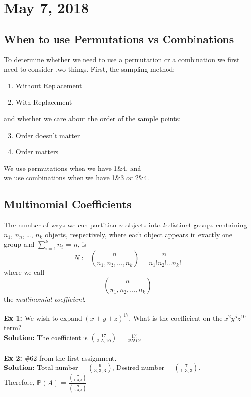 \documentclass{article}
\newcommand{\ti}[1]{\textit{#1}}
\newcommand{\bbP}{\mathbb{P}}
\begin{document}
\newpage


\section{May 7, 2018}
\subsection{When to use Permutations vs Combinations}
To determine whether we need to use a permutation or a combination we first need to consider two things. First, the sampling method:
\begin{enumerate}
	\item Without Replacement
	\item With Replacement
\end{enumerate} 
and whether we care about the order of the sample points:
\begin{enumerate}
\setcounter{enumi}{2}
	\item Order doesn't matter
	\item Order matters
\end{enumerate}
We use permutations when we have 1\&4, and\\
we use combinations when we have 1\&3 $or$ 2\&4.
\subsection{Multinomial Coefficients}
The number of ways we can partition $n$ objects into $k$ distinct groups containing $n_{1}$, $n_{n}$, \dots, $n_{k}$ objects, respectively, where each object appears in exactly one group and $\sum_{i=1}^{k} n_{i}$ = $n$, is
\[N := {n\choose{n_{1}, n_{2}, \dots, n_{k}}} = \frac{n!}{n_{1}! n_{2}! \dots n_{k}!} \]
where we call
\[{n\choose{n_{1}, n_{2}, \dots, n_{k}}} \]
the \ti{multinomial coefficient}.\\\\
\textbf{Ex 1:} We wish to expand $(x + y + z)^{17}$. What is the coefficient on the $x^{2}y^{5}z^{10}$ term?\\
\textbf{Solution:} The coefficient is ${17\choose{2, 5, 10}}$ = $\frac{17!}{2!5!10!}$\\\\
\textbf{Ex 2:} \#62 from the first assignment.\\
\textbf{Solution:} Total number = ${9\choose{3, 3, 3}}$, Desired number = ${7\choose{1, 3, 3}}$.\\
Therefore, $\bbP(A)$ = $\frac{{7\choose{1, 3, 3}}}{{9\choose{3, 3, 3}}}$
\end{document}
